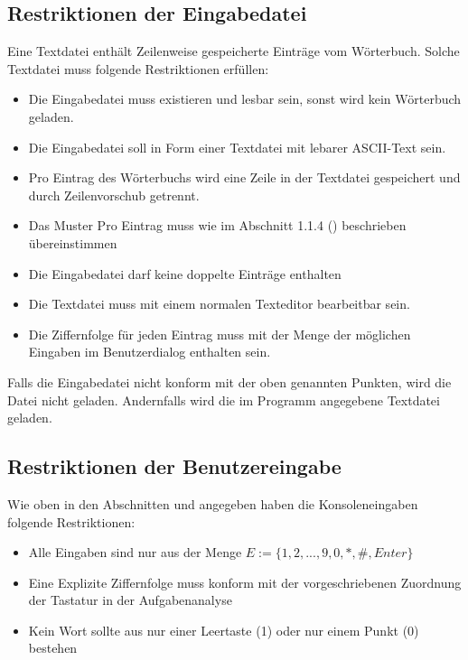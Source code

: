 \subsection{Restriktionen der Eingabedatei}
Eine Textdatei enthält Zeilenweise gespeicherte Einträge vom Wörterbuch.
Solche Textdatei muss folgende Restriktionen erfüllen:
\begin{itemize}
    \item Die Eingabedatei muss existieren und lesbar sein, sonst wird kein Wörterbuch geladen.
    \item Die Eingabedatei soll in Form einer Textdatei mit lebarer ASCII-Text sein.
    \item Pro Eintrag des Wörterbuchs wird eine Zeile in der Textdatei gespeichert und durch Zeilenvorschub getrennt.
    \item Das Muster Pro Eintrag muss wie im Abschnitt 1.1.4 () beschrieben übereinstimmen
    \item Die Eingabedatei darf keine doppelte Einträge enthalten
    \item Die Textdatei muss mit einem normalen Texteditor bearbeitbar sein.
    \item Die Ziffernfolge für jeden Eintrag muss mit der Menge der möglichen Eingaben im Benutzerdialog enthalten sein.
\end{itemize}

Falls die Eingabedatei nicht konform mit der oben genannten Punkten, wird die Datei nicht geladen.
Andernfalls wird die im Programm angegebene Textdatei geladen.

\subsection{Restriktionen der Benutzereingabe}
Wie oben in den Abschnitten \textbf{} und \textbf{} angegeben haben die Konsoleneingaben folgende Restriktionen:
\begin{itemize}
    \item Alle Eingaben sind nur aus der Menge $E:=\{1,2,...,9,0,*,\# ,Enter\}$
    \item Eine Explizite Ziffernfolge muss konform mit der vorgeschriebenen Zuordnung der Tastatur in der Aufgabenanalyse
    \item Kein Wort sollte aus nur einer Leertaste (1) oder nur einem Punkt (0) bestehen
\end{itemize}